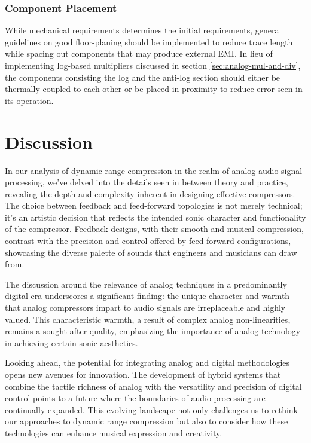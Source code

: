 \documentclass[10pt]{article}
\begin{document}
\begin{multicols*}{2}
                \subsubsection{Component Placement}
                    While mechanical requirements determines the initial requirements, general guidelines on good floor-planing should be implemented to reduce trace length while spacing out components that may produce external EMI. In lieu of implementing log-based multipliers discussed in section \ref{sec:analog-mul-and-div}, the components consisting the log and the anti-log section should either be thermally coupled to each other or be placed in proximity to reduce error seen in its operation.
        
        \section*{Discussion}
            In our analysis of dynamic range compression in the realm of analog audio signal processing, we've delved into the details seen in between theory and practice, revealing the depth and complexity inherent in designing effective compressors. The choice between feedback and feed-forward topologies is not merely technical; it's an artistic decision that reflects the intended sonic character and functionality of the compressor. Feedback designs, with their smooth and musical compression, contrast with the precision and control offered by feed-forward configurations, showcasing the diverse palette of sounds that engineers and musicians can draw from.\par
            The discussion around the relevance of analog techniques in a predominantly digital era underscores a significant finding: the unique character and warmth that analog compressors impart to audio signals are irreplaceable and highly valued. This characteristic warmth, a result of complex analog non-linearities, remains a sought-after quality, emphasizing the importance of analog technology in achieving certain sonic aesthetics.\par 
            Looking ahead, the potential for integrating analog and digital methodologies opens new avenues for innovation. The development of hybrid systems that combine the tactile richness of analog with the versatility and precision of digital control points to a future where the boundaries of audio processing are continually expanded. This evolving landscape not only challenges us to rethink our approaches to dynamic range compression but also to consider how these technologies can enhance musical expression and creativity.


\end{multicols*}
\end{document}
